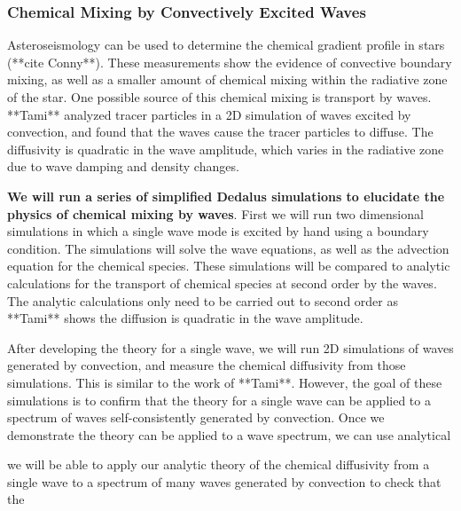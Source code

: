 {\color{purple}
\subsubsection{Chemical Mixing by Convectively Excited Waves}
}

Asteroseismology can be used to determine the chemical gradient profile in stars (**cite Conny**). These measurements show the evidence of convective boundary mixing, as well as a smaller amount of chemical mixing within the radiative zone of the star. One possible source of this chemical mixing is transport by waves. **Tami** analyzed tracer particles in a 2D simulation of waves excited by convection, and found that the waves cause the tracer particles to diffuse. The diffusivity is quadratic in the wave amplitude, which varies in the radiative zone due to wave damping and density changes.

\textbf{We will run a series of simplified Dedalus simulations to elucidate the physics of chemical mixing by waves}. First we will run two dimensional simulations in which a single wave mode is excited by hand using a boundary condition. The simulations will solve the wave equations, as well as the advection equation for the chemical species. These simulations will be compared to analytic calculations for the transport of chemical species at second order by the waves. The analytic calculations only need to be carried out to second order as **Tami** shows the diffusion is quadratic in the wave amplitude.

After developing the theory for a single wave, we will run 2D simulations of waves generated by convection, and measure the chemical diffusivity from those simulations. This is similar to the work of **Tami**. However, the goal of these simulations is to confirm that the theory for a single wave can be applied to a spectrum of waves self-consistently generated by convection. Once we demonstrate the theory can be applied to a wave spectrum, we can use analytical

we will be able to apply our analytic theory of the chemical diffusivity from a single wave to a spectrum of many waves generated by convection to check that the 
